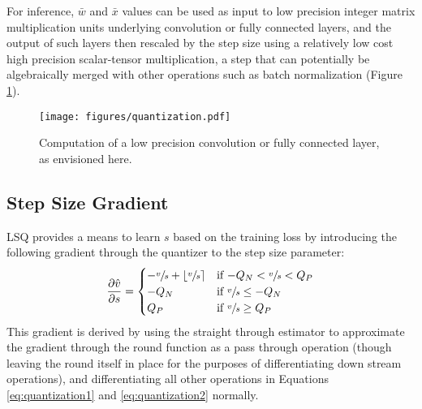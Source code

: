 \documentclass{article}
\begin{document}
For inference, $\bar{w}$ and $\bar{x}$ values can be used as input to low precision integer matrix multiplication units underlying convolution or fully connected layers, and the output of such layers then rescaled by the step size using a relatively low cost high precision scalar-tensor multiplication, a step that can potentially be algebraically merged with other operations such as batch normalization (Figure \ref{fig:quantization}).

\begin{figure}[ht]
\begin{center}
  	\centerline{\texttt{[image: figures/quantization.pdf]}}
  	\caption{
  	Computation of a low precision convolution or fully connected layer, as envisioned here.
  	}
  	\label{fig:quantization}
	\end{center}
\end{figure}


\subsection{Step Size Gradient}
\label{methods:LSQ}

LSQ provides a means to learn $s$ based on the training loss by introducing the following gradient through the quantizer to the step size parameter:
\begin{equation}\label{eq:lsq}
\frac{\partial{\hat{v}}}{\partial{s}} =
\begin{cases}
-\sfrac{v}{s} + \lfloor \sfrac{v}{s} \rceil			& \text{if $-Q_N < \sfrac{v}{s} < Q_P$} \\
-Q_N									& \text{if $\sfrac{v}{s} \le -Q_N$} \\
Q_P									& \text{if $\sfrac{v}{s} \ge Q_P$} \\
\end{cases}
\end{equation}
This gradient is derived by using the straight through estimator \citep{bengio2013estimating} to approximate the gradient through the round function as a pass through operation (though leaving the round itself in place for the purposes of differentiating down stream operations), and differentiating all other operations in Equations \ref{eq:quantization1} and \ref{eq:quantization2} normally.
\end{document}
